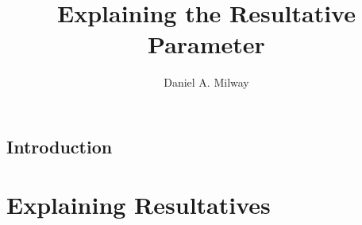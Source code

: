 \documentclass[
	12pt,
	twoside,
	narrowmargins
	]{ut-thesis}
\author{Daniel A. Milway}
\title{Explaining the Resultative Parameter}
\theoremstyle{definition}
\begin{document}
\begin{preliminary}
  \maketitle
  
%  
  \tableofcontents
  \listoftables
  \listoffigures
  \listoftheorems[ignoreall,show={defn}]
\end{preliminary}
\chapter{Introduction}


\part{Explaining Resultatives}\label{sec:part1}
%
%
\end{document}
